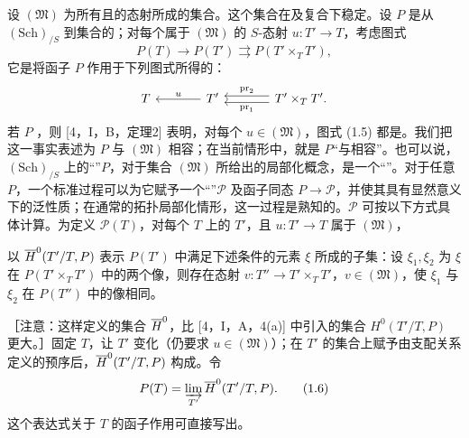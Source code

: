 设 $(\mathfrak M)$ 为所有且的态射所成的集合。这个集合在及复合下稳定。设 $P$ 是从 $(\mathrm{Sch})_{/S}$ 到集合的；对每个属于 $(\mathfrak M)$ 的 $S$-态射 $u:T'\to T$，考虑图式
\begin{equation}P(T)\longrightarrow P(T')\rightrightarrows P(T'\times_T T'),\tag{1.5}\end{equation}
它是将函子 $P$ 作用于下列图式所得的：
\[
\begin{tikzcd}[column sep=large]
T & T'\arrow[l,"u"'] & T'\times_T T'\arrow[l,shift left=.6ex,"\operatorname{pr}_1"]\arrow[l,shift right=.6ex,"\operatorname{pr}_2"'].
\end{tikzcd}
\]
若 $P$ ，则 [4，I，B，定理2] 表明，对每个 $u\in(\mathfrak M)$，图式 (1.5) 都是。我们把这一事实表述为 $P$ 与 $(\mathfrak M)$ 相容；在当前情形中，就是 $P$“与相容”。也可以说，$(\mathrm{Sch})_{/S}$ 上的“”$P$，对于集合 $(\mathfrak M)$ 所给出的局部化概念，是一个“”。对于任意 $P$，一个标准过程可以为它赋予一个“”$\mathcal P$ 及函子同态 $P\to\mathcal P$，并使其具有显然意义下的泛性质；在通常的拓扑局部化情形，这一过程是熟知的。$\mathcal P$ 可按以下方式具体计算。为定义 $\mathcal P(T)$，对每个 $T$ 上的 $T'$，且 $u:T'\to T$ 属于 $(\mathfrak M)$，

以 $\overline H^0(T'/T,P)$ 表示 $P(T')$ 中满足下述条件的元素 $\xi$ 所成的子集：设 $\xi_1,\xi_2$ 为 $\xi$ 在 $P(T'\times_T T')$ 中的两个像，则存在态射 $v:T''\to T'\times_T T'$，$v\in(\mathfrak M)$，使 $\xi_1$ 与 $\xi_2$ 在 $P(T'')$ 中的像相同。

［注意：这样定义的集合 $\overline H^0$，比 [4，I，A，4(a)] 中引入的集合 $H^0(T'/T,P)$ 更大。］固定 $T$，让 $T'$ 变化（仍要求 $u\in(\mathfrak M)$）；在 $T'$ 的集合上赋予由支配关系定义的预序后，$\overline H^0(T'/T,P)$ 构成。令
\begin{equation}P(T)=\varinjlim_{T'}\overline H^0(T'/T,P).\tag{1.6}\end{equation}
这个表达式关于 $T$ 的函子作用可直接写出。

